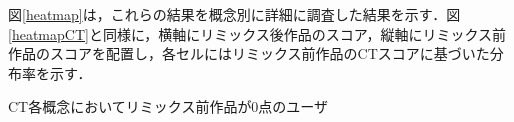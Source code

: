 \documentclass[submit,techrep,noauthor]{ipsj}
\newcommand{\memo}[1]{\colorbox{magenta!30}{\textbf{MEMO}}{\color{red!50}\textbf{[#1]}}}
\begin{document}


図\ref{heatmap}は，これらの結果を概念別に詳細に調査した結果を示す．図\ref{heatmapCT}と同様に，横軸にリミックス後作品のスコア，縦軸にリミックス前作品のスコアを配置し，各セルにはリミックス前作品のCTスコアに基づいた分布率を示す．

CT各概念においてリミックス前作品が0点のユーザ






\end{document}

